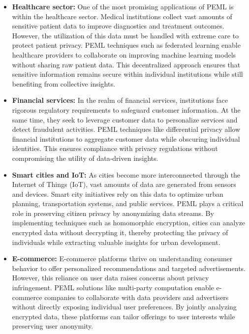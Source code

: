 \begin{itemize}
    \item \textbf{Healthcare sector:} One of the most promising applications of PEML is within the healthcare sector. Medical institutions collect vast amounts of sensitive patient data to improve diagnostics and treatment outcomes. However, the utilization of this data must be handled with extreme care to protect patient privacy. PEML techniques such as federated learning enable healthcare providers to collaborate on improving machine learning models without sharing raw patient data. This decentralized approach ensures that sensitive information remains secure within individual institutions while still benefiting from collective insights.
    \item \textbf{Financial services:} In the realm of financial services, institutions face rigorous regulatory requirements to safeguard customer information. At the same time, they seek to leverage customer data to personalize services and detect fraudulent activities. PEML techniques like differential privacy allow financial institutions to aggregate customer data while obscuring individual identities. This ensures compliance with privacy regulations without compromising the utility of data-driven insights.
    \item \textbf{Smart cities and IoT:} As cities become more interconnected through the Internet of Things (IoT), vast amounts of data are generated from sensors and devices. Smart city initiatives rely on this data to optimize urban planning, transportation systems, and public services. PEML plays a critical role in preserving citizen privacy by anonymizing data streams. By implementing techniques such as homomorphic encryption, cities can analyze encrypted data without decrypting it, thereby protecting the privacy of individuals while extracting valuable insights for urban development.
    \item \textbf{E-commerce:} E-commerce platforms thrive on understanding consumer behavior to offer personalized recommendations and targeted advertisements. However, this reliance on user data raises concerns about privacy infringement. PEML solutions like multi-party computation enable e-commerce companies to collaborate with data providers and advertisers without directly exposing individual user preferences. By jointly analyzing encrypted data, these platforms can tailor offerings to user interests while preserving user anonymity.
\end{itemize}



